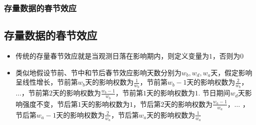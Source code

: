 \documentclass{beamer}
\begin{document}
\begin{frame}
\frametitle{存量数据的春节效应}
\subsection{存量数据的春节效应}
\begin{itemize}
\item 传统的存量春节效应就是当观测日落在影响期内，则定义变量为$1$，否则为$0$
\item 类似地假设节前、节中和节后春节效应影响天数分别为$w_{b}, w_{d}, w_{a}$天，假定影响呈线性增长，节前第$w_{b}$天的影响权数为$\frac{1}{w_{b}}$，节前第$w_{b}-1$天的影响权数为$\frac{2}{w_{b}}$，$\dots$，节前第$2$天的影响权数为$\frac{w_{b}-1}{w_{b}}$，节前第$1$天的影响权数为$1$. 节日期间$w_{d}$天影响强度不变，节后第$1$天的影响权数为$1$，节后第$2$天的影响权数为$\frac{w_{a}-1}{w_{a}}$，$\dots$ ， 节后第$w_{a}-1$天的影响权数为$\frac{2}{w_{a}}$，节后第$w_{a}$天的影响权数为$\frac{1}{w_{a}}$
\end{itemize}
\begin{center}
\pagestyle{empty}
\end{center}
\end{frame}
\end{document}
